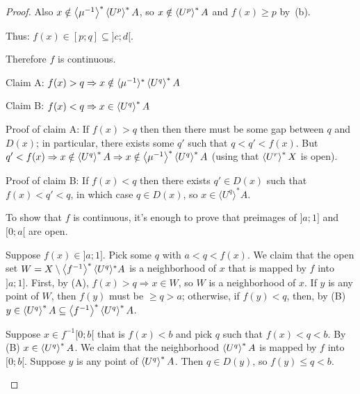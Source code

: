 \begin{proof}
Also $x\notin\left\langle \mu^{-1}\right\rangle ^{\ast}\left\langle U^p\right\rangle ^{\ast}A$, so $x\notin\left\langle U^p\right\rangle ^{\ast}A$ and $f(x)\geq p$ by~(b).

Thus: $f(x)\in[p;q]\subseteq]c;d[$.

Therefore $f$ is continuous.

\begin{grayed}
Claim A: $f (x) > q \Rightarrow x \notin \langle \mu^{- 1}
\rangle^{\ast} \left\langle U^q\right\rangle ^{\ast} A$

Claim B: $f (x) < q \Rightarrow x \in \left\langle U^q\right\rangle ^{\ast} A$

Proof of claim A: If $f (x) > q$ then then there must be some gap between $q$
and $D (x)$; in particular, there exists some $q'$ such that $q < q' < f (x)$.
But $q' < f (x) \Rightarrow x \notin \left\langle U^q\right\rangle ^{\ast} A \Rightarrow x
\notin \left\langle \mu^{- 1}\right\rangle ^{\ast} \left\langle U^q\right\rangle ^{\ast} A$ (using that $\left\langle U^r\right\rangle ^{\ast}X$ is open).

Proof of claim B: If $f (x) < q$ then there exists $q' \in D (x)$ such that $f
(x) < q' < q$, in which case $q \in D (x)$, so $x \in \langle U^q
\rangle^{\ast} A$.

To show that $f$ is continuous, it's enough to prove that preimages of $] a ;
1]$ and $[0 ; a [$ are open.

Suppose $f (x) \in] a ; 1]$. Pick some $q$ with $a < q < f (x)$. We claim that
the open set $W = X \setminus \left\langle f^{- 1}\right\rangle ^{\ast} \langle U^q
\rangle^{\ast} A$ is a neighborhood of $x$ that is mapped by $f$ into $] a ;
1]$. First, by (A), $f (x) > q \Rightarrow x \in W$, so $W$ is a neighborhood
of $x$. If $y$ is any point of $W$, then $f (y)$ must be $\geq q > a$;
otherwise, if $f (y) < q$, then, by (B) $y \in \left\langle U^q\right\rangle ^{\ast} A
\subseteq \left\langle f^{- 1}\right\rangle ^{\ast} \left\langle U^q\right\rangle ^{\ast} A$.

Suppose $x \in f^{- 1} [0 ; b [$ that is $f (x) < b$ and pick $q$ such that $f
(x) < q < b$. By (B) $x \in \left\langle U^q\right\rangle ^{\ast} A$. We claim that the
neighborhood $\left\langle U^q\right\rangle ^{\ast} A$ is mapped by $f$ into $[0 ; b [$.
Suppose $y$ is any point of $\left\langle U^q\right\rangle ^{\ast} A$. Then $q \in D
(y)$, so $f (y) \leq q < b$.
\end{grayed}
\end{proof}